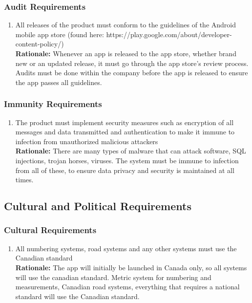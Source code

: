 \documentclass[]{article}
\begin{document}
\subsubsection{Audit Requirements}
\label{ssub:audit_requirements}
\begin{enumerate}[{SR-AU}1. ]
	\item All releases of the product must conform to the guidelines of the Android mobile app store (found here: https://play.google.com/about/developer-content-policy/) \\
	{\bf Rationale:} Whenever an app is released to the app store, whether brand new or an updated release, it must go through the app store's review process. Audits must be done within the company before the app is released to ensure the app passes all guidelines.
\end{enumerate}

\subsubsection{Immunity Requirements}
\label{ssub:immunity_requirements}
\begin{enumerate}[{SR-IM}1. ]
	\item The product must implement security measures such as encryption \color{red} of all messages and data transmitted \color{black} and authentication to make it immune to infection from unauthorized malicious attackers \\
	{\bf Rationale:} There are many types of malware that can attack software, SQL injections, trojan horses, viruses. The system must be immune to infection from all of these, to ensure data privacy and security is maintained at all times.
\end{enumerate}


\subsection{Cultural and Political Requirements}
\label{sub:cultural_and_political_requirements}

\subsubsection{Cultural Requirements}
\label{ssub:cultural_requirements}
\begin{enumerate}[{CP-C}1. ]
	\item All numbering systems, road systems and any other systems must use the Canadian standard \\
	{\bf Rationale:} The app will initially be launched in Canada only, so all systems will use the canadian standard. Metric system for numbering and measurements, Canadian road systems, everything that requires a national standard will use the Canadian standard.
\end{enumerate}
\end{document}
